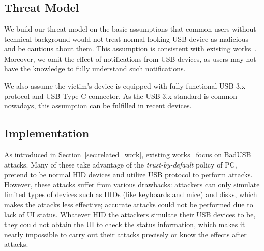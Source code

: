 \section{\tool}
\label{sec:badusb}
\subsection{Threat Model}

We build our threat model on the basic assumptions that common users without
technical background would not treat normal-looking \ac{USB} device as malicious and be cautious about them. This assumption is consistent with existing works~\cite{JFCImpact}. Moreover, we omit the
effect of notifications from \ac{USB} devices, as users may not have the knowledge to fully understand such notifications.

We also assume the victim's device is equipped with fully functional \ac{USB} 3.x
protocol and \ac{USB} Type-C connector. As the \ac{USB} 3.x standard is
common nowadays, this assumption can be fulfilled in recent
devices.


\subsection{Implementation}

As introduced in Section~\ref{sec:related_work},
existing works~\cite{rubber,badusb,
rubberducky2020,usbbypassing,iseeyou,usbdriver} focus on BadUSB attacks.
Many of these take advantage of the \textit{trust-by-default} policy of PC,
pretend to be normal \ac{HID} devices and utilize \ac{USB} protocol to perform attacks.
However, these attacks suffer from various drawbacks:  attackers can
only simulate limited types of devices such as \acp{HID} (like keyboards and mice)
and disks, which makes the attacks less effective;  accurate attacks
could not be performed due to lack of \ac{UI} status. Whatever \ac{HID} the
attackers simulate their \ac{USB} devices to be, they could not obtain the \ac{UI} to
check the status information, which makes it nearly impossible to carry out
their attacks precisely or know the effects after attacks.

